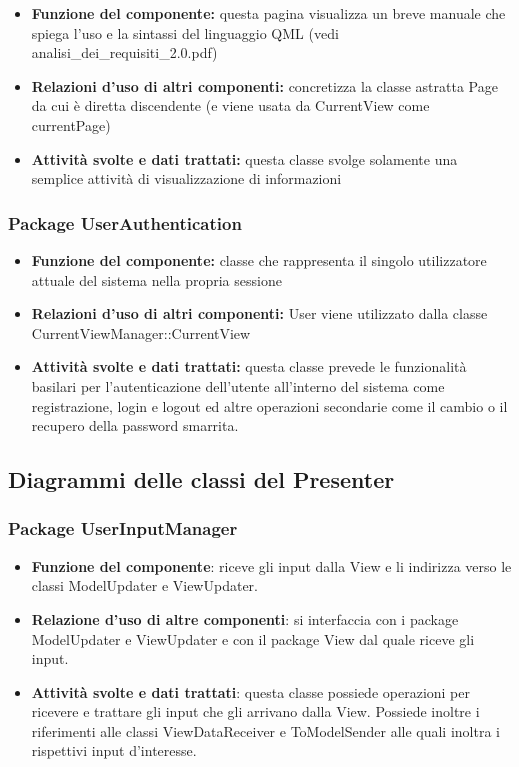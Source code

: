 \documentclass[a4paper,11pt]{article}
\begin{document}
			\begin{itemize}
		    \item\textbf{Funzione del componente:} questa pagina visualizza un breve manuale che spiega l'uso e la sintassi del linguaggio QML (vedi analisi\_dei\_requisiti\_2.0.pdf)
			\item\textbf{Relazioni d'uso di altri componenti:} concretizza la classe astratta Page da cui è diretta discendente (e viene usata da CurrentView come currentPage)
			\item\textbf{Attività svolte e dati trattati:} questa classe svolge solamente una semplice attività di visualizzazione di informazioni
			\end{itemize}
			\subsubsection{Package UserAuthentication}
			\begin{itemize}
\item\textbf{Funzione del componente:} classe che rappresenta il singolo utilizzatore attuale del sistema nella propria sessione
\item\textbf{Relazioni d'uso di altri componenti:} User viene utilizzato dalla classe CurrentViewManager::CurrentView
\item\textbf{Attività svolte e dati trattati:} questa classe prevede le funzionalità basilari per l'autenticazione dell'utente all'interno del sistema come registrazione, login e  logout ed altre operazioni secondarie come il cambio o il recupero della password smarrita.
			\end{itemize}
			\newpage
			
			\subsection{Diagrammi delle classi del Presenter}
			\subsubsection{Package UserInputManager}
			\begin{itemize}
				\item\textbf{Funzione del componente}: riceve gli input dalla View e li indirizza verso le classi ModelUpdater e ViewUpdater.
				\item\textbf{Relazione d'uso di altre componenti}: si interfaccia con i package ModelUpdater e ViewUpdater e con il package View dal quale riceve gli input.
				\item\textbf{Attività svolte e dati trattati}: questa classe possiede operazioni per ricevere e trattare gli input che gli arrivano dalla View. Possiede inoltre i riferimenti alle classi ViewDataReceiver e ToModelSender alle quali inoltra i rispettivi input d'interesse.
			\end{itemize}
\end{document}
